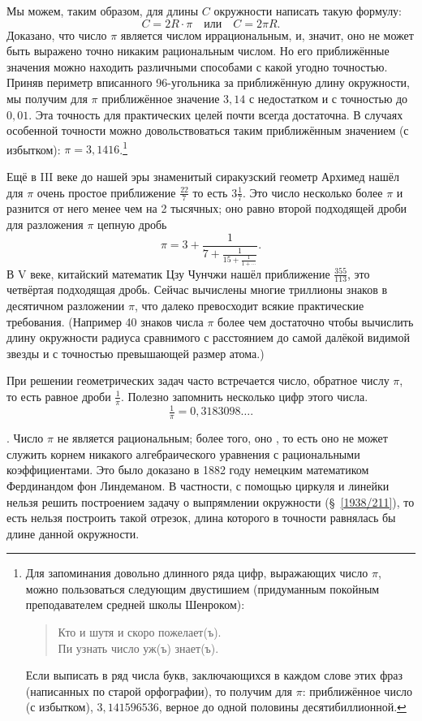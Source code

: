 \documentclass[oneside]{book}
\begin{document}
Мы можем, таким образом, для длины $C$ окружности написать такую формулу:
\[C=2R\cdot\pi
\quad\text{или}\quad
C=2\pi R.
\]
Доказано, что число $\pi$ является числом иррациональным, и, значит, оно не может быть выражено точно никаким рациональным числом.
Но его приближённые значения можно находить различными способами с какой угодно точностью.
Приняв периметр вписанного 96-угольника за приближённую длину окружности, мы получим для $\pi$ приближённое значение $3{,}14$ с недостатком и с точностью до $0{,}01$.
Эта точность для практических целей почти всегда достаточна.
В случаях особенной точности можно довольствоваться таким приближённым значением (с избытком):
$\pi = 3{,}1416$.\footnote{Для запоминания довольно длинного ряда цифр, выражающих число $\pi$, можно пользоваться следующим  двустишием (придуманным покойным преподавателем средней школы Шенроком):
\begin{verse}
Кто и шутя и скоро пожелает(ъ).\\
Пи узнать число уж(ъ) знает(ъ).
\end{verse}
Если выписать в ряд числа букв, заключающихся в каждом слове этих фраз (написанных по старой орфографии), то получим для $\pi$:
приближённое число (с избытком), $3{,}141596536$, верное до одной половины десятибиллионной.}%

Ещё в III веке до нашей эры знаменитый сиракузский геометр Архимед нашёл для $\pi$ очень простое приближение $\tfrac{22}7$ то есть $3\tfrac17$.
Это число несколько более $\pi$ и разнится от него менее чем на 2 тысячных;
оно равно второй подходящей дроби для разложения $\pi$ цепную дробь
\[\pi=3+\frac{1}{7+\frac{1}{15+\frac{1}{1+\cdots}}}.\]
В V веке, китайский математик Цзу Чунчжи нашёл приближение $\tfrac{355}{113}$, это четвёртая подходящая дробь. 
Сейчас вычислены многие триллионы знаков в десятичном разложении $\pi$, что далеко превосходит всякие практические требования.
(Например 40 знаков числа $\pi$ более чем достаточно чтобы вычислить длину окружности радиуса сравнимого с расстоянием до самой далёкой видимой звезды и с точностью превышающей размер атома.) 

При решении геометрических задач часто встречается число, обратное числу $\pi$, то есть равное дроби $\tfrac1\pi$.
Полезно запомнить несколько цифр этого числа.
\[\tfrac1\pi = 0{,}3183098\dots.\]

\smallskip
{}.
Число $\pi$ не является рациональным;
более того, оно , то есть оно не может служить корнем никакого алгебраического уравнения с рациональными коэффициентами.
Это было доказано в 1882 году немецким математиком Фердинандом фон Линдеманом.
В частности, с помощью циркуля и линейки нельзя решить построением задачу о выпрямлении окружности (§~\ref{1938/211}), то есть нельзя построить такой отрезок, длина которого в точности равнялась бы длине данной окружности.
\end{document}
